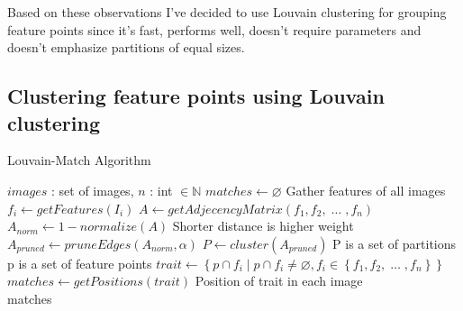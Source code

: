 \documentclass{article}
\begin{document}
Based on these observations I've decided to use Louvain clustering for 
grouping feature points since it's fast, performs well, doesn't require 
parameters and doesn't emphasize partitions of equal sizes.

\subsection{Clustering feature points using Louvain clustering}

\begin{algorithm}
\caption{Louvain-Match Algorithm}
\label{alg-simple}
\begin{algorithmic}
\Require $images$ : set of images, $n$ : int $\in \mathbb{N}$
\State $matches\gets \varnothing$
 \Comment Gather features of all images
	\State $f_i\gets getFeatures(I_i)$
\EndFor
\State $A\gets getAdjecencyMatrix(f_1, f_2,\; \ldots \;, f_n)$
\State $A_{norm}\gets 1 - normalize(A)$
\Comment Shorter distance is higher weight
\State $A_{pruned}\gets pruneEdges(A_{norm},\alpha)$
\State $P\gets cluster(A_{pruned})$ 
\Comment P is a set of partitions
 \Comment p is a set of feature points
	\State $trait\gets \left\{p \cap f_i \mid p \cap f_i \neq 
\varnothing, f_i \in \left\{f_1, f_2,\; \ldots \;, f_n\right\}\right\}$
		\State $matches\gets getPositions(trait)$
		\Comment Position of trait in each image
	\EndIf
\EndFor \\
\Return matches
\end{algorithmic}
\end{algorithm}
\end{document}

